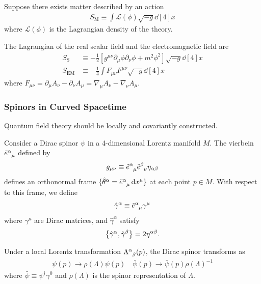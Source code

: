 \documentclass[10pt]{article}
\begin{document}
Suppose there exists matter described by an action
\begin{align}
    S_{\text{M}}\equiv\int\mathcal{L}(\phi)\sqrt{-g}\dd[4]{x}
\end{align}
where $\mathcal{L}(\phi)$ is the Lagrangian density of the theory.
\begin{example}
    The Lagrangian of the real scalar field and the electromagnetic field are
    \begin{align}
        S_{\text{S}}  & \equiv-\frac{1}{2}\left[g^{\mu\nu}\partial_\mu\phi\partial_\nu\phi+m^2\phi^2\right]\sqrt{-g}\dd[4]{x} \\
        S_{\text{EM}} & \equiv-\frac{1}{4}\int F_{\mu\nu}F^{\mu\nu}\sqrt{-g}\dd[4]{x}
    \end{align}
    where $F_{\mu\nu}=\partial_\mu A_\nu-\partial_\nu A_\mu=\nabla_\mu A_\nu-\nabla_\nu A_\mu$.
\end{example}

\subsubsection{Spinors in Curved Spacetime}
\begin{intu}
    Quantum field theory should be locally and covariantly constructed\cite{Hollands:2014eia}.
\end{intu}
Consider a Dirac spinor $\psi$ in a 4-dimensional Lorentz manifold $M$.
The vierbein $\tensor{\tilde{e}}{^\alpha_\mu}$ defined by
\begin{align}
    g_{\mu\nu}\equiv \tensor{\tilde{e}}{^\alpha_\mu}\tensor{\tilde{e}}{^\beta_\nu}\eta_{\alpha\beta}
\end{align}
defines an orthonormal frame $\{\hat{\theta}^\alpha=\tensor{\tilde{e}}{^\alpha_\mu}\dd{x^\mu}\}$ at each point $p\in M$.
With respect to this frame, we define
\begin{align}
    \hat{\gamma}^\alpha\equiv\tensor{\tilde{e}}{^\alpha_\mu}\gamma^\mu
\end{align}
where $\gamma^\mu$ are Dirac matrices, and $\hat{\gamma}^\alpha$ satisfy
\begin{align}
    \acomm{\hat{\gamma}^\alpha}{\hat{\gamma}^\beta}=2\eta^{\alpha\beta}.
\end{align}

Under a local Lorentz transformation $\tensor{\Lambda}{^\alpha_\beta}(p)$, the Dirac spinor transforms as
\begin{align}
    \psi(p)\to\rho(\Lambda)\psi(p)\quad \bar{\psi}(p)\to\bar{\psi}(p)\rho(\Lambda)^{-1}
\end{align}
where $\bar{\psi}\equiv\psi^\dagger\gamma^0$ and $\rho(\Lambda)$ is the spinor representation of $\Lambda$.
\end{document}
